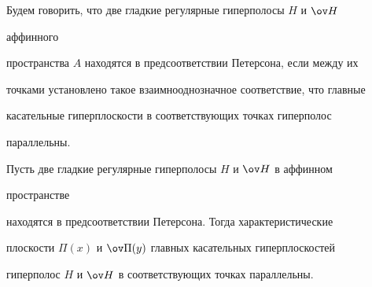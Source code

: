  


\begin{defn} 


Будем говорить, что две гладкие регулярные гиперполосы $H$ и $\ov H$ 


аффинного 


пространства $A$ находятся в предсоответствии Петерсона, если между их 


точками установлено такое взаимнооднозначное соответствие, что главные 


касательные гиперплоскости в соответствующих точках гиперполос 


параллельны. 


\end{defn} 


 


\begin{lemnonum} 


Пусть две гладкие регулярные гиперполосы $H$ и $\ov H$ в аффинном 


пространстве 


находятся в предсоответствии Петерсона. Тогда характеристические 


плоскости $\Pi(x)$ и $\ov\Pi(y)$ главных касательных гиперплоскостей 


гиперполос $H$ и $\ov H$ в соответствующих точках параллельны. 


\end{lemnonum} 


 


